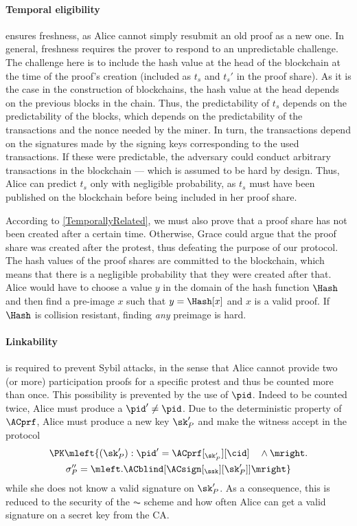 \paragraph{Temporal eligibility}%
\label{analysis-temporal}

 ensures freshness, as Alice cannot simply resubmit an old proof as a new one.
In general, freshness requires the prover to respond to an unpredictable challenge.
The challenge here is to include the hash value at the head of the blockchain at the time of the proof's creation (included as \(t_s\) and \(t_s'\) in the proof share).
As it is the case in the construction of blockchains, the hash value at the head depends on the previous blocks in the chain.
Thus, the predictability of \(t_s\) depends on the predictability of the blocks, which depends on the predictability of the transactions and the nonce needed by the miner.
In turn, the transactions depend on the signatures made by the signing keys corresponding to the used transactions.
If these were predictable, the adversary could conduct arbitrary transactions in the blockchain --- which is assumed to be hard by design.
Thus, Alice can predict \(t_s\) only with negligible probability, as \(t_s\) must have been published on the blockchain before being included in her proof share.

According to \cref{TemporallyRelated}, we must also prove that a proof share has not been created after a certain time.
Otherwise, Grace could argue that the proof share was created after the protest, thus defeating the purpose of our protocol.
The hash values of the proof shares are committed to the blockchain, which means that there is a negligible probability that they were created after that.
Alice would have to choose a value \(y\) in the domain of the hash function \(\Hash\) and then find a pre-image \(x\) such that \(y = \Hash[x]\) and \(x\) is a valid proof.
If \(\Hash\) is collision resistant, finding \emph{any} preimage is hard.

\paragraph{Linkability}%
\label{analysis-linkability}

 is required to prevent Sybil attacks, in the sense
that Alice cannot provide two (or more) participation proofs for a
specific protest and thus be counted more than once.
This possibility is prevented by the use of \(\pid\).
Indeed to be counted twice, Alice must produce a \(\pid'\neq \pid\).
Due to the deterministic property of \(\ACprf\), Alice must produce a new key \(\sk_P'\) and make the witness accept in the protocol
\begin{multline*}
\PK\mleft\{ (\sk_P') : \pid' = \ACprf[_{\sk_P'}][\cid] \quad \land \mright. \\
    \sigma_P'' = \mleft. \ACblind[\ACsign[_{\ssk}][\sk_P']] \mright\}
\end{multline*}
while she does not know a valid signature on \(\sk_P'\).
As a consequence, this is reduced to the security of the \(\AC\) scheme and how often Alice can get a valid signature on a secret key from the \ac{CA}.

